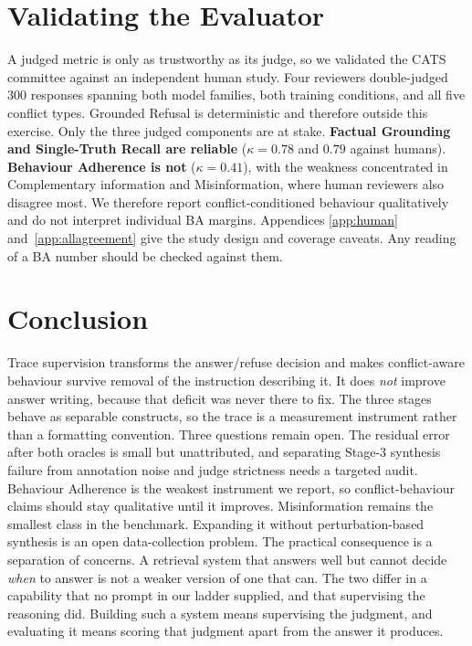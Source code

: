 \section{Validating the Evaluator}
\label{sec:human}

A judged metric is only as trustworthy as its judge, so we validated the CATS
committee against an independent human study. Four reviewers double-judged 300
responses spanning both model families, both training conditions, and all five
conflict types. Grounded Refusal is deterministic and therefore outside this
exercise. Only the three judged components are at stake. \textbf{Factual Grounding
and Single-Truth Recall are reliable} ($\kappa=0.78$ and $0.79$ against humans).
\textbf{Behaviour Adherence is not} ($\kappa=0.41$), with the weakness
concentrated in Complementary information and Misinformation, where human
reviewers also disagree most. We therefore report conflict-conditioned behaviour
qualitatively and do not interpret individual BA margins. Appendices
\ref{app:human} and~\ref{app:allagreement} give the study design and coverage
caveats. Any reading of a BA number should be checked against them.

\section{Conclusion}
\label{sec:conclusion}

Trace supervision transforms the answer/refuse decision
and makes conflict-aware behaviour survive removal of the instruction describing
it. It does \emph{not} improve answer writing, because that deficit was never
there to fix. The three stages behave as separable constructs, so the trace
is a measurement instrument rather than a formatting convention. Three questions remain open. The residual error after both oracles is small but unattributed, and separating
Stage-3 synthesis failure from annotation noise and judge strictness needs a
targeted audit. Behaviour Adherence is the weakest instrument we report, so
conflict-behaviour claims should stay qualitative until it improves. Misinformation remains the smallest class in the benchmark. Expanding it without
perturbation-based synthesis is an open data-collection problem. The practical consequence is a separation of concerns. A retrieval system that
answers well but cannot decide \emph{when} to answer is not a weaker version of
one that can. The two differ in a capability that no prompt in our ladder
supplied, and that supervising the reasoning did. Building such a system means
supervising the judgment, and evaluating it means scoring that judgment apart
from the answer it produces.

